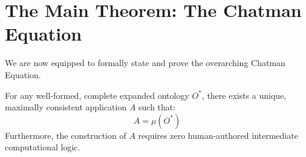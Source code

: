 \section{The Main Theorem: The Chatman Equation}

We are now equipped to formally state and prove the overarching Chatman Equation.

\begin{theorem}
\label{thm:chatman}
For any well-formed, complete expanded ontology $O^*$, there exists a unique, maximally consistent application $A$ such that:
\begin{equation}
    A = \mu(O^*)
\end{equation}
Furthermore, the construction of $A$ requires zero human-authored intermediate computational logic.
\end{theorem}

